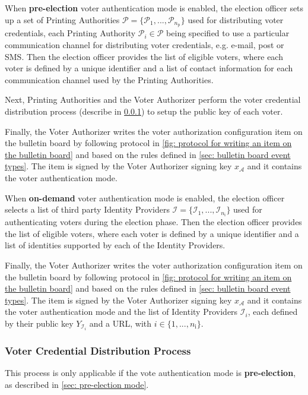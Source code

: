 When \textbf{pre-election} voter authentication mode is enabled, the election officer sets up a set of Printing Authorities $\boldsymbol{\mathcal{P}} = \{ \mathcal{P}_1, ..., \mathcal{P}_{n_\mathrm{p}} \}$ used for distributing voter credentials, each Printing Authority $\mathcal{P}_i \in \boldsymbol{\mathcal{P}}$ being specified to use a particular communication channel for distributing voter credentials, e.g. e-mail, post or SMS. Then the election officer provides the list of eligible voters, where each voter is defined by a unique identifier and a list of contact information for each communication channel used by the Printing Authorities.

Next, Printing Authorities and the Voter Authorizer perform the voter credential distribution process (describe in \cref{sec: voter credential distribution process}) to setup the public key of each voter.

Finally, the Voter Authorizer writes the voter authorization configuration item on the bulletin board by following protocol in \cref{fig: protocol for writing an item on the bulletin board} and based on the rules defined in \cref{sec: bulletin board event types}. The item is signed by the Voter Authorizer signing key $x_\mathcal{A}$ and it contains the voter authentication mode.

When \textbf{on-demand} voter authentication mode is enabled, the election officer selects a list of third party Identity Providers $\boldsymbol{\mathcal{I}} = \{ \mathcal{I}_1, ..., \mathcal{I}_{n_\mathrm{i}} \}$ used for authenticating voters during the election phase. Then the election officer provides the list of eligible voters, where each voter is defined by a unique identifier and a list of identities supported by each of the Identity Providers.

Finally, the Voter Authorizer writes the voter authorization configuration item on the bulletin board by following protocol in \cref{fig: protocol for writing an item on the bulletin board} and based on the rules defined in \cref{sec: bulletin board event types}. The item is signed by the Voter Authorizer signing key $x_\mathcal{A}$ and it contains the voter authentication mode and the list of Identity Providers $\mathcal{I}_i$, each defined by their public key $Y_{\mathcal{I}_i}$ and a URL, with $i \in \{ 1, ..., n_\mathrm{i} \}$.


\subsubsection{Voter Credential Distribution Process} \label{sec: voter credential distribution process}
This process is only applicable if the vote authentication mode is \textbf{pre-election}, as described in \cref{sec: pre-election mode}.

